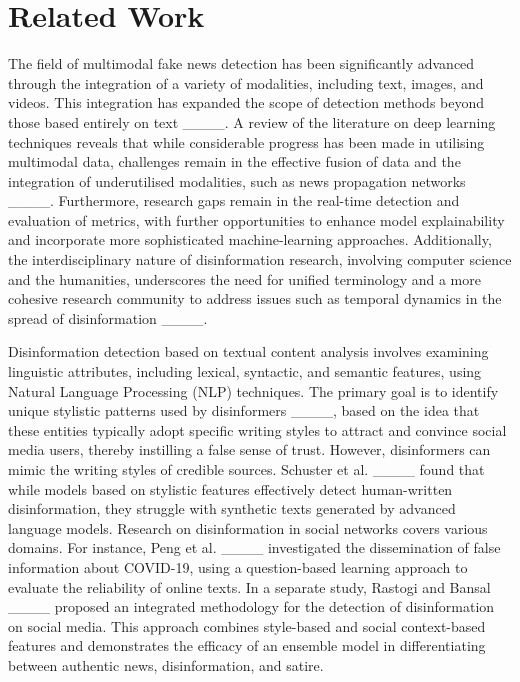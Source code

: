 \section{Related Work}
\label{sec:related_work}

The field of multimodal fake news detection has been significantly advanced through the integration of a variety of modalities, including text, images, and videos. This integration has expanded the scope of detection methods beyond those based entirely on text ____. A review of the literature on deep learning techniques reveals that while considerable progress has been made in utilising multimodal data, challenges remain in the effective fusion of data and the integration of underutilised modalities, such as news propagation networks ____. Furthermore, research gaps remain in the real-time detection and evaluation of metrics, with further opportunities to enhance model explainability and incorporate more sophisticated machine-learning approaches. Additionally, the interdisciplinary nature of disinformation research, involving computer science and the humanities, underscores the need for unified terminology and a more cohesive research community to address issues such as temporal dynamics in the spread of disinformation ____.

Disinformation detection based on textual content analysis involves examining linguistic attributes, including lexical, syntactic, and semantic features, using Natural Language Processing (NLP) techniques. The primary goal is to identify unique stylistic patterns used by disinformers ____, based on the idea that these entities typically adopt specific writing styles to attract and convince social media users, thereby instilling a false sense of trust. However, disinformers can mimic the writing styles of credible sources. Schuster et al. ____ found that while models based on stylistic features effectively detect human-written disinformation, they struggle with synthetic texts generated by advanced language models. Research on disinformation in social networks covers various domains. For instance, Peng et al. ____ investigated the dissemination of false information about COVID-19, using a question-based learning approach to evaluate the reliability of online texts. In a separate study, Rastogi and Bansal ____ proposed an integrated methodology for the detection of disinformation on social media. This approach combines style-based and social context-based features and demonstrates the efficacy of an ensemble model in differentiating between authentic news, disinformation, and satire.

